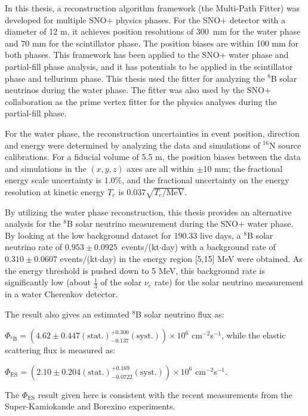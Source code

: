 In this thesis, a reconstruction algorithm framework (the Multi-Path Fitter) was developed for multiple SNO+ physics phases. For the SNO+ detector with a diameter of 12 m, it achieves position resolutions of 300~mm for the water phase and 70 mm for the scintillator phase. The position biases are within 100 mm for both phases. This framework has been applied to the SNO+ water phase and partial-fill phase analysis, and it has potentials to be applied in the scintillator phase and tellurium phase. This thesis used the fitter for analyzing the $^8$B solar neutrinos during the water phase. The fitter was also used by the SNO+ collaboration as the prime vertex fitter for the physics analyses during the partial-fill phase.

For the water phase, the reconstruction uncertainties in event position, direction and energy were determined by analyzing the data and simulations of $^{16}$N source calibrations. For a fiducial volume of 5.5 m, the position biases between the data and simulations in the $(x,y,z)$ axes are all within $\pm10$ mm; the fractional energy scale uncertainty is $1.0$\%, and the fractional uncertainty on the energy resolution at kinetic energy $T_e$ is $0.037\sqrt{T_e/\mathrm{MeV}}$.

By utilizing the water phase reconstruction, this thesis provides an alternative analysis for the $^8$B solar neutrino measurement during the SNO+ water phase. By looking at the low background dataset for 190.33 live days, a $^8$B solar neutrino rate of $0.953\pm0.0925$~events/(kt$\cdot$day) with a background rate of $0.310\pm 0.0607$ events/(kt$\cdot$day) in the energy region [5,15] MeV were obtained. As the energy threshold is pushed down to 5 MeV, this background rate is significantly low (about $\frac{1}{3}$ of the solar $\nu_e$ rate) for the solar neutrino measurement in a water Cherenkov detector.

The result also gives an estimated $^8$B solar neutrino flux as: 

$\Phi_{\mathrm{^8B}}=(4.62 \pm 0.447 \mathrm{(stat.)}^{+0.300}_{-0.137}\mathrm{(syst.)})\times10^6$ cm$^{-2}$s$^{-1}$, 
while the elastic scattering flux is measured as: 

$\Phi_{\mathrm{ES}}=(2.10 \pm 0.204\mathrm{(stat.)}^{+0.169}_{-0.0722}\mathrm{(syst.)})\times10^6$ cm$^{-2}$s$^{-1}$.

The $\Phi_{\mathrm{ES}}$ result given here is consistent with the recent measurements from the Super-Kamiokande and Borexino experiments.
